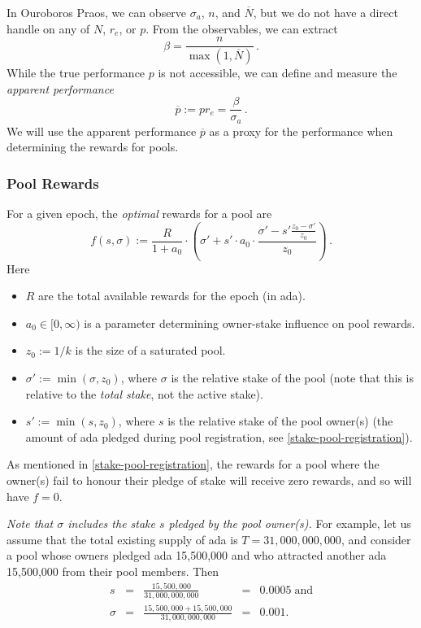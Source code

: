 \documentclass[11pt,a4paper,dvipsnames,twosided]{article}
\newcommand\pbar{\overline{p}}
\newcommand\Nbar{\overline{N}}
\begin{document}
In Ouroboros Praos, we can observe \(\sigma_a\), \(n\), and \(\Nbar\), but
we do not have a direct handle on any of \(N\), \(r_e\), or \(p\). From the
observables, we can extract
\begin{equation}
  \beta = \frac{n}{\max(1, \Nbar)}\,.
  \label{eq:beta}
\end{equation}
While the true performance \(p\) is not accessible, we can define and measure
the \emph{apparent performance}
\[
\pbar := p r_e = \frac{\beta}{\sigma_a}\,.
\]
We will use the apparent performance \(\pbar\) as a proxy for the performance
when determining the rewards for pools.

\subsubsection{Pool Rewards}
\label{pool-rewards}

For a given epoch, the \emph{optimal} rewards for a pool are
\begin{equation}
  f(s,\sigma) :=
  \frac{R}{1 + a_0}
  \cdot
  \left(\sigma' + s'\cdot a_0\cdot\frac{\sigma' -
    s'\frac{z_0-\sigma'}{z_0}}{z_0}\right)\,.
  \label{eq:optimal-rewards}
\end{equation}
Here

\begin{itemize}
\item
  \(R\) are the total available rewards for the epoch (in ada).
\item
  \(a_0\in[0,\infty)\) is a parameter determining owner-stake influence on pool
    rewards.
\item
  \(z_0:=1/k\) is the size of a saturated pool.
\item
  \(\sigma':=\min(\sigma, z_0)\), where \(\sigma\) is the relative stake of the
  pool (note that this is relative to the \emph{total stake}, not the active
  stake).
\item
  \(s':=\min(s, z_0)\), where \(s\) is the relative stake of the pool
  owner(s) (the amount of ada pledged during pool registration,
  see \cref{stake-pool-registration}).
\end{itemize}

As mentioned in \cref{stake-pool-registration}, the rewards for a pool
where the owner(s) fail to honour their pledge of stake will receive
zero rewards, and so will have $f=0$.

\emph{Note that \(\sigma\) includes the stake \(s\) pledged by the pool
owner(s).} For example, let us assume that the total existing supply of
ada is \(T=31,000,000,000\), and consider a pool whose owners
pledged ada 15,500,000 and who attracted another ada 15,500,000 from their
pool members. Then \[
\begin{array}{rcccl}
    s                  & = & \displaystyle\frac{15,500,000}{31,000,000,000}              & = & 0.0005\;\text{and} \\[5mm]
    \sigma & = & \displaystyle\frac{15,500,000 + 15,500,000}{31,000,000,000} & = & 0.001. \\
\end{array}
\]
\end{document}
